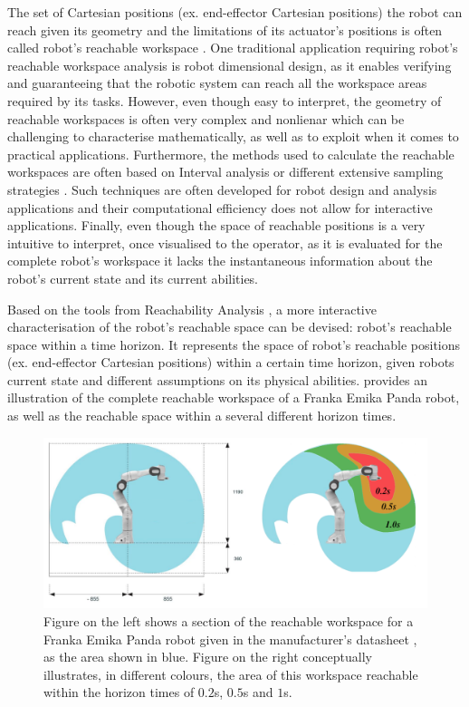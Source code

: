 The set of Cartesian positions (ex. end-effector Cartesian positions) the robot can reach given its geometry and the limitations of its actuator's positions is often called robot's reachable workspace \cite{Gosselin1991Synthesis,Vahrenkamp2016,kucuk2005robot}. One traditional application requiring robot's reachable workspace analysis is robot dimensional design, as it enables verifying and guaranteeing that the robotic system can reach all the workspace areas required by its tasks. However, even though easy to interpret, the geometry of reachable workspaces is often very complex and nonlienar which can be challenging to characterise mathematically, as well as to exploit when it comes to practical applications. Furthermore, the methods used to calculate the reachable workspaces are often based on Interval analysis \cite{gouttefarde2011interval} or different extensive sampling strategies \cite{Vahrenkamp2016,Zacharias2007}. Such techniques are often developed for robot design and analysis applications and their computational efficiency does not allow for interactive applications. Finally, even though the space of reachable positions is a very intuitive to interpret, once visualised to the operator, as it is evaluated for the complete robot's workspace it lacks the instantaneous information about the robot's current state and its current abilities.

Based on the tools from Reachability Analysis \cite{althoff2010reachability,althoff2014}, a more interactive characterisation of the robot's reachable space can be devised: robot's reachable space within a time horizon. It represents the space of robot's reachable positions (ex. end-effector Cartesian positions) within a certain time horizon, given robots current state and different assumptions on its physical abilities.  provides an illustration of the complete reachable workspace of a Franka Emika Panda robot, as well as the reachable space within a several different horizon times.

\begin{figure}
    \centering
    \includegraphics[width=0.8\linewidth]{Papers/images/all_rs_thesis.png}
    \caption{Figure on the left shows a section of the reachable workspace for a Franka Emika Panda robot given in the manufacturer's datasheet \cite{franka_maual}, as the area shown in blue. Figure on the right conceptually illustrates, in different colours, the area of this workspace reachable within the horizon times of $0.2$s, $0.5$s and $1$s.}
    \label{fig:franak_reachable_worksapce}
\end{figure}

